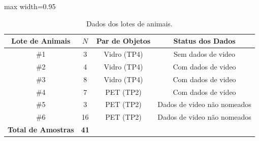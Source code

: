 \begin{table}[tbp]
    \centering
    \small
    \setlength{\tabcolsep}{3.5pt}
    \caption{Dados dos lotes de animais.}
    \label{tab:lotes_comportamento}
    \begin{adjustbox}{max width=0.95\textwidth}
        \begin{tabular}{cccc}
            \toprule
            \textbf{Lote de Animais}   & \textbf{$N$} & \textbf{Par de Objetos} & \textbf{Status dos Dados}   \\
            \midrule
            \#1                        & 3            & Vidro (TP4)             & Sem dados de video          \\
            \#2                        & 4            & Vidro (TP4)             & Com dados de video          \\
            \#3                        & 8            & Vidro (TP4)             & Com dados de video          \\
            \#4                        & 7            & PET (TP2)               & Com dados de video          \\
            \#5                        & 3            & PET (TP2)               & Dados de video não nomeados \\
            \#6                        & 16           & PET (TP2)               & Dados de video não nomeados \\
            \midrule
            \textbf{Total de Amostras} & \textbf{41}  &                         &                             \\
            \bottomrule
        \end{tabular}
    \end{adjustbox}
\end{table}
